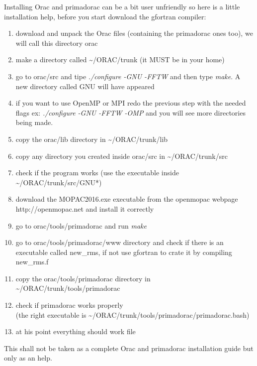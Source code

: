 		Installing Orac and primadorac can be a bit user unfriendly so here is a little installation help, before you start download the gfortran compiler:
		\begin{enumerate}
			\item download and unpack the Orac files (containing the primadorac ones too), we will call this directory orac
			
			\item make a directory called \textasciitilde/ORAC/trunk (it MUST be in your home)
			
			\item go to orac/src and tipe \emph{./configure -GNU -FFTW} and then type \emph{make}. A new directory called GNU will have appeared
			
			\item if you want to use OpenMP or MPI redo the previous step with the needed flags ex: \emph{./configure -GNU -FFTW -OMP} and you will see more directories being made.
			
			\item copy the orac/lib directory in \textasciitilde/ORAC/trunk/lib
			
			\item copy any directory you created inside orac/src in \textasciitilde/ORAC/trunk/src
			
			\item check if the program works (use the executable inside \textasciitilde/ORAC/trunk/src/GNU*)
			
			\item download the MOPAC2016.exe executable from the openmopac webpage http://openmopac.net and install it correctly
			
			\item go to orac/tools/primadorac and run \emph{make}
			
			\item go to orac/tools/primadorac/www directory and check if there is an executable called new\_rms, if not use gfortran to crate it by compiling new\_rms.f
			
			\item copy the orac/tools/primadorac directory in \textasciitilde/ORAC/trunk/tools/primadorac
			
			\item check if primadorac works properly\\
			(the right executable is  \textasciitilde/ORAC/trunk/tools/primadorac/primadorac.bash)
			
			\item at his point everything should work file
			
		\end{enumerate}
	
		This shall not be taken as a complete Orac and primadorac installation guide but only as an help.
